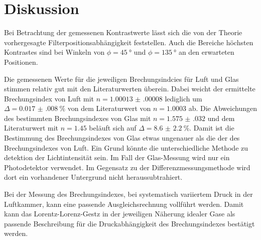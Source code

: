 \section{Diskussion}
\label{sec:Diskussion}


Bei Betrachtung der gemessenen Kontrastwerte lässt sich die von der Theorie vorhergesagte Filterpositionsabhängigkeit feststellen. 
Auch die Bereiche höchsten Kontrastes sind bei Winkeln von $\phi = \SI{45}{\degree}$ und $\phi = \SI{135}{\degree}$ an den erwarteten Positionen.


Die gemessenen Werte für die jeweiligen Brechungsindcies für Luft und Glas stimmen relativ gut mit den Literaturwerten überein.
Dabei weicht der ermittelte Brechungsindex von Luft mit $n = \num{1.00013(00008)}$ lediglich um $\Delta = \SI{0.017(008)}{\percent}$ von dem Literaturwert \cite{Dem2} von $n = \num{1.0003}$ ab.
Die Abweichungen des bestimmten Brechungsindexes von Glas mit $n = \num{1.575(032)}$ und dem Literaturwert \cite{Dem2} mit $n = \num{1.45}$ beläuft sich auf $\Delta = \SI{8.6(22)}{\percent}$.
Damit ist die Bestimmung des Brechungsindexes von Glas etwas ungenauer als die der des Brechungsindexes von Luft. 
Ein Grund könnte die unterschiedliche Methode zu detektion der Lichtintensität sein. 
Im Fall der Glas-Messung wird nur ein Photodetektor verwendet. 
Im Gegensatz zu der Differenzmessungsmethode wird dort ein vorhandener Untergrund nicht heraussubtrahiert.


Bei der Messung des Brechungsindexes, bei systematisch variiertem Druck in der Luftkammer, kann eine passende Ausgleichsrechnung vollführt werden. 
Damit kann das Lorentz-Lorenz-Gestz in der jeweiligen Näherung idealer Gase als passende Beschreibung für die Druckabhängigkeit des Brechungsindexes bestätigt werden.


